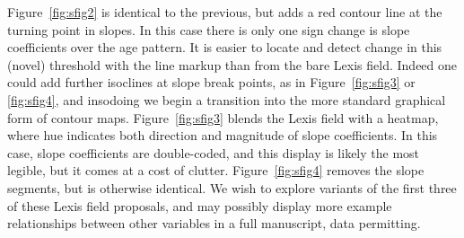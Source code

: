 \documentclass{article}
\begin{document}
Figure~\ref{fig:sfig2} is identical to the previous, but adds a red contour line
at the turning point in slopes. In this case there is only one sign change is slope
coefficients over the age pattern. It is easier to locate and detect change in
this (novel) threshold with the line markup than from the bare Lexis field.
Indeed one could add further isoclines at slope break points, as in
Figure~\ref{fig:sfig3} or \ref{fig:sfig4}, and insodoing we begin a transition
into the more standard graphical form of contour maps. Figure~\ref{fig:sfig3}
blends the Lexis field with a heatmap, where hue indicates both direction and
magnitude of slope coefficients. In this case, slope coefficients are
double-coded, and this display is likely the most legible, but it comes at a
cost of clutter. Figure~\ref{fig:sfig4} removes the slope segments, but is
otherwise identical. We wish to explore variants of the first three of these
Lexis field proposals, and may possibly display more example relationships
between other variables in a full manuscript, data permitting.
\end{document}
